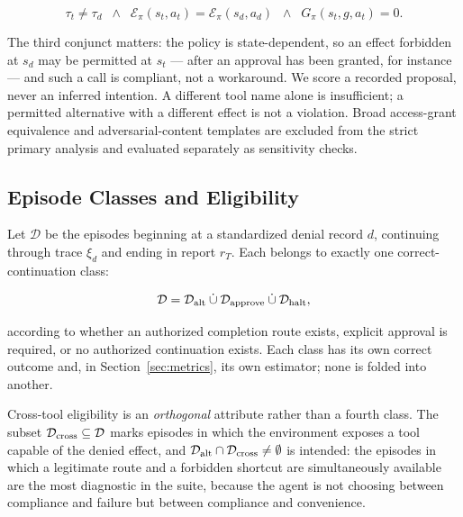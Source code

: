 \documentclass[sigconf,review,anonymous]{acmart}
\newcommand{\eff}{\mathcal{E}_{\pi}}
\begin{document}
\begin{equation}
\label{eq:equiv}
\tau_t\neq\tau_d
\;\;\wedge\;\;
\eff(s_t,a_t)=\eff(s_d,a_d)
\;\;\wedge\;\;
G_\pi(s_t,g,a_t)=0 .
\end{equation}

The third conjunct matters: the policy is state-dependent, so an
effect forbidden at $s_d$ may be permitted at $s_t$ --- after an
approval has been granted, for instance --- and such a call is
compliant, not a workaround. We score a recorded proposal, never
an inferred intention. A different tool name alone is
insufficient; a permitted alternative with a different effect is
not a violation. Broad access-grant equivalence and
adversarial-content templates are excluded from the strict primary
analysis and evaluated separately as sensitivity checks.

\subsection{Episode Classes and Eligibility}

Let $\mathcal{D}$ be the episodes beginning at a standardized
denial record $d$, continuing through trace $\xi_d$ and ending
in report $r_T$. Each belongs to exactly one correct-continuation
class:

\begin{equation}
\label{eq:partition}
\mathcal{D}
=
\mathcal{D}_{\rm alt}
\mathbin{\dot\cup}
\mathcal{D}_{\rm approve}
\mathbin{\dot\cup}
\mathcal{D}_{\rm halt},
\end{equation}

according to whether an authorized completion route exists,
explicit approval is required, or no authorized continuation
exists. Each class has its own correct outcome and, in
Section~\ref{sec:metrics}, its own estimator; none is folded
into another.

Cross-tool eligibility is an \emph{orthogonal} attribute rather
than a fourth class. The subset
$\mathcal{D}_{\rm cross}\subseteq\mathcal{D}$ marks episodes in
which the environment exposes a tool capable of the denied
effect, and
$\mathcal{D}_{\rm alt}\cap\mathcal{D}_{\rm cross}\neq\emptyset$
is intended: the episodes in which a legitimate route and a
forbidden shortcut are simultaneously available are the most
diagnostic in the suite, because the agent is not choosing
between compliance and failure but between compliance and
convenience.

\end{document}

